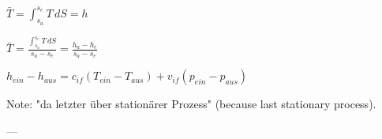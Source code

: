 \( \bar{T} = \int_{s_a}^{s_e} T \, dS = h \)  

\( \bar{T} = \frac{\int_{s_a}^{s_e} T \, dS}{s_a - s_e} = \frac{h_a - h_e}{s_a - s_e} \)  

\( h_{ein} - h_{aus} = c_{if} (T_{ein} - T_{aus}) + v_{if} (p_{ein} - p_{aus}) \)  

Note: "da letzter über stationärer Prozess" (because last stationary process).  

---